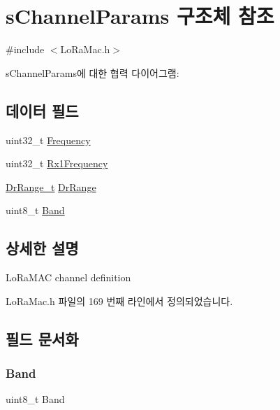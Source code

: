 \hypertarget{structs_channel_params}{}\section{s\+Channel\+Params 구조체 참조}
\label{structs_channel_params}


{\ttfamily \#include $<$Lo\+Ra\+Mac.\+h$>$}



s\+Channel\+Params에 대한 협력 다이어그램\+:
\subsection*{데이터 필드}
\begin{DoxyCompactItemize}
\item 
uint32\+\_\+t \mbox{\hyperlink{structs_channel_params_ade3d190636488dad9a89b19446b7acf1}{Frequency}}
\item 
uint32\+\_\+t \mbox{\hyperlink{structs_channel_params_a8a564b8635b12d5f0f348ae177dd92e1}{Rx1\+Frequency}}
\item 
\mbox{\hyperlink{group___l_o_r_a_m_a_c_ga8b818a36013d6bdd83ac5fd20f42b503}{Dr\+Range\+\_\+t}} \mbox{\hyperlink{structs_channel_params_ad4d9b041ea740886a05fa8a1d06997a2}{Dr\+Range}}
\item 
uint8\+\_\+t \mbox{\hyperlink{structs_channel_params_a724c03aa06953111c3291243831f251b}{Band}}
\end{DoxyCompactItemize}


\subsection{상세한 설명}
Lo\+Ra\+M\+AC channel definition 

Lo\+Ra\+Mac.\+h 파일의 169 번째 라인에서 정의되었습니다.



\subsection{필드 문서화}
\mbox{\label{structs_channel_params_a724c03aa06953111c3291243831f251b}} 
\subsubsection{\texorpdfstring{Band}{Band}}
{\footnotesize\ttfamily uint8\+\_\+t Band}


